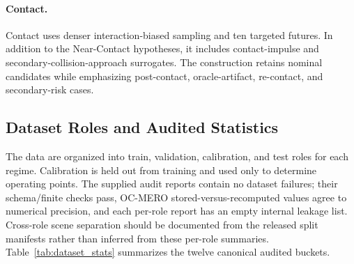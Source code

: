 \documentclass{article} %
\begin{document}
\paragraph{Contact.}
Contact uses denser interaction-biased sampling and ten targeted futures. In addition to the Near-Contact hypotheses, it includes contact-impulse and secondary-collision-approach surrogates. The construction retains nominal candidates while emphasizing post-contact, oracle-artifact, re-contact, and secondary-risk cases.

\subsection{Dataset Roles and Audited Statistics}
The data are organized into train, validation, calibration, and test roles for each regime. Calibration is held out from training and used only to determine operating points. The supplied audit reports contain no dataset failures; their schema/finite checks pass, OC-MERO stored-versus-recomputed values agree to numerical precision, and each per-role report has an empty internal leakage list. Cross-role scene separation should be documented from the released split manifests rather than inferred from these per-role summaries. Table~\ref{tab:dataset_stats} summarizes the twelve canonical audited buckets.
\end{document}
